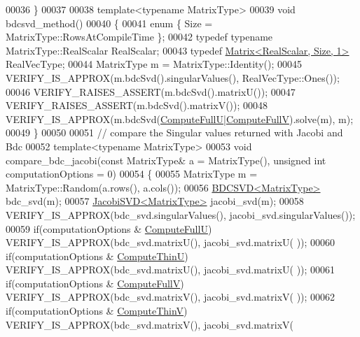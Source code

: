 \begin{DoxyCode}
00036 \}
00037 
00038 \textcolor{keyword}{template}<\textcolor{keyword}{typename} MatrixType>
00039 \textcolor{keywordtype}{void} bdcsvd\_method()
00040 \{
00041   \textcolor{keyword}{enum} \{ Size = MatrixType::RowsAtCompileTime \};
00042   \textcolor{keyword}{typedef} \textcolor{keyword}{typename} MatrixType::RealScalar RealScalar;
00043   \textcolor{keyword}{typedef} \hyperlink{group___core___module_class_eigen_1_1_matrix}{Matrix<RealScalar, Size, 1>} RealVecType;
00044   MatrixType m = MatrixType::Identity();
00045   VERIFY\_IS\_APPROX(m.bdcSvd().singularValues(), RealVecType::Ones());
00046   VERIFY\_RAISES\_ASSERT(m.bdcSvd().matrixU());
00047   VERIFY\_RAISES\_ASSERT(m.bdcSvd().matrixV());
00048   VERIFY\_IS\_APPROX(m.bdcSvd(\hyperlink{group__enums_ggae3e239fb70022eb8747994cf5d68b4a9a2b4f91ca5859a4159dbfe8090043817f}{ComputeFullU}|\hyperlink{group__enums_ggae3e239fb70022eb8747994cf5d68b4a9a52c6f7e80bbf9a42297c88f700245b51}{ComputeFullV}).solve(m), m);
00049 \}
00050 
00051 \textcolor{comment}{// compare the Singular values returned with Jacobi and Bdc}
00052 \textcolor{keyword}{template}<\textcolor{keyword}{typename} MatrixType> 
00053 \textcolor{keywordtype}{void} compare\_bdc\_jacobi(\textcolor{keyword}{const} MatrixType& a = MatrixType(), \textcolor{keywordtype}{unsigned} \textcolor{keywordtype}{int} computationOptions = 0)
00054 \{
00055   MatrixType m = MatrixType::Random(a.rows(), a.cols());
00056   \hyperlink{group___s_v_d___module_class_eigen_1_1_b_d_c_s_v_d}{BDCSVD<MatrixType>} bdc\_svd(m);
00057   \hyperlink{group___s_v_d___module_class_eigen_1_1_jacobi_s_v_d}{JacobiSVD<MatrixType>} jacobi\_svd(m);
00058   VERIFY\_IS\_APPROX(bdc\_svd.singularValues(), jacobi\_svd.singularValues());
00059   \textcolor{keywordflow}{if}(computationOptions & \hyperlink{group__enums_ggae3e239fb70022eb8747994cf5d68b4a9a2b4f91ca5859a4159dbfe8090043817f}{ComputeFullU}) VERIFY\_IS\_APPROX(bdc\_svd.matrixU(), jacobi\_svd.matrixU(
      ));
00060   \textcolor{keywordflow}{if}(computationOptions & \hyperlink{group__enums_ggae3e239fb70022eb8747994cf5d68b4a9af8c742a1aa87773e165eae406c9ccaf8}{ComputeThinU}) VERIFY\_IS\_APPROX(bdc\_svd.matrixU(), jacobi\_svd.matrixU(
      ));
00061   \textcolor{keywordflow}{if}(computationOptions & \hyperlink{group__enums_ggae3e239fb70022eb8747994cf5d68b4a9a52c6f7e80bbf9a42297c88f700245b51}{ComputeFullV}) VERIFY\_IS\_APPROX(bdc\_svd.matrixV(), jacobi\_svd.matrixV(
      ));
00062   \textcolor{keywordflow}{if}(computationOptions & \hyperlink{group__enums_ggae3e239fb70022eb8747994cf5d68b4a9a1055e53fa95c8ae04a07ebb72cfafd95}{ComputeThinV}) VERIFY\_IS\_APPROX(bdc\_svd.matrixV(), jacobi\_svd.matrixV(

\end{DoxyCode}
